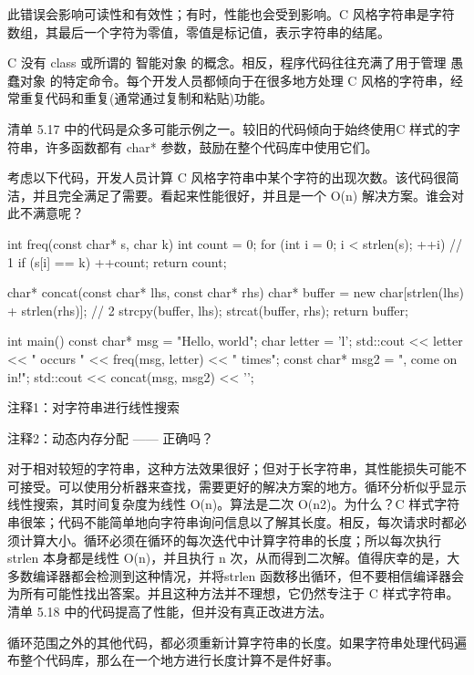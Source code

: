 此错误会影响可读性和有效性；有时，性能也会受到影响。C 风格字符串是字符数组，其最后一个字符为零值，零值是标记值，表示字符串的结尾。


C 没有 class 或所谓的 智能对象 的概念。相反，程序代码往往充满了用于管理 愚蠢对象 的特定命令。每个开发人员都倾向于在很多地方处理 C 风格的字符串，经常重复代码和重复(通常通过复制和粘贴)功能。

清单 5.17 中的代码是众多可能示例之一。较旧的代码倾向于始终使用C 样式的字符串，许多函数都有 char* 参数，鼓励在整个代码库中使用它们。

考虑以下代码，开发人员计算 C 风格字符串中某个字符的出现次数。该代码很简洁，并且完全满足了需要。看起来性能很好，并且是一个 O(n) 解决方案。谁会对此不满意呢？


\begin{cpp}
int freq(const char* s, char k) {
  int count = 0;
  for (int i = 0; i < strlen(s); ++i) // 1
    if (s[i] == k)
      ++count;
  return count;
}

char* concat(const char* lhs, const char* rhs) {
  char* buffer = new char[strlen(lhs) + strlen(rhs)]; // 2
  strcpy(buffer, lhs);
  strcat(buffer, rhs);
  return buffer;
}

int main() {
  const char* msg = "Hello, world";
  char letter = 'l';
  std::cout << letter << " occurs " << freq(msg, letter) << " times\n";
  const char* msg2 = ", come on in!";
  std::cout << concat(msg, msg2) << '\n';
}
\end{cpp}

{\footnotesize
注释1：对字符串进行线性搜索

注释2：动态内存分配 —— 正确吗？
}


对于相对较短的字符串，这种方法效果很好；但对于长字符串，其性能损失可能不可接受。可以使用分析器来查找，需要更好的解决方案的地方。循环分析似乎显示线性搜索，其时间复杂度为线性 O(n)。算法是二次 O(n2)。为什么？C 样式字符串很笨；代码不能简单地向字符串询问信息以了解其长度。相反，每次请求时都必须计算大小。循环必须在循环的每次迭代中计算字符串的长度；所以每次执行 strlen 本身都是线性 O(n)，并且执行 n 次，从而得到二次解。值得庆幸的是，大多数编译器都会检测到这种情况，并将strlen 函数移出循环，但不要相信编译器会为所有可能性找出答案。并且这种方法并不理想，它仍然专注于 C 样式字符串。清单 5.18 中的代码提高了性能，但并没有真正改进方法。

循环范围之外的其他代码，都必须重新计算字符串的长度。如果字符串处理代码遍布整个代码库，那么在一个地方进行长度计算不是件好事。

